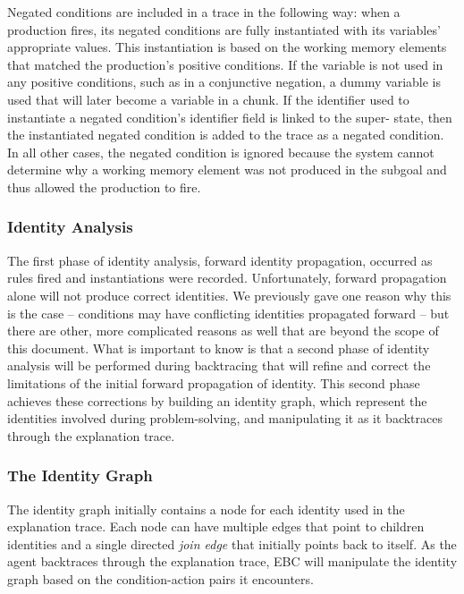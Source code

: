 Negated conditions are included in a trace in the following way: when a production fires, its negated conditions are fully instantiated with its variables' appropriate values. This instantiation is based on the working memory elements that matched the production's positive conditions. If the variable is not used in any positive conditions, such as in a conjunctive negation, a dummy variable is used that will later become a variable in a chunk.  If the identifier used to instantiate a negated condition's identifier field is linked to the super- state, then the instantiated negated condition is added to the trace as a negated condition. In all other cases, the negated condition is ignored because the system cannot determine why a working memory element was not produced in the subgoal and thus allowed the production to fire. 

\subsubsection{Identity Analysis}

The first phase of identity analysis, forward identity propagation, occurred as rules fired and instantiations were recorded.  Unfortunately, forward propagation alone will not produce correct identities.  We previously gave one reason why this is the case -- conditions may have conflicting identities propagated forward -- but there are other, more complicated reasons as well that are beyond the scope of this document. What is important to know is that a second phase of identity analysis will be performed during backtracing that will refine and correct the limitations of the initial forward propagation of identity. This second phase achieves these corrections by building an identity graph, which represent the identities involved during problem-solving, and manipulating it as it backtraces through the explanation trace.

\subsubsection*{The Identity Graph}

The identity graph initially contains a node for each identity used in the explanation trace.  Each node can have multiple edges that point to children identities and a single directed \textit{join edge} that initially points back to itself.  As the agent backtraces through the explanation trace, EBC will manipulate the identity graph based on the condition-action pairs it encounters.

